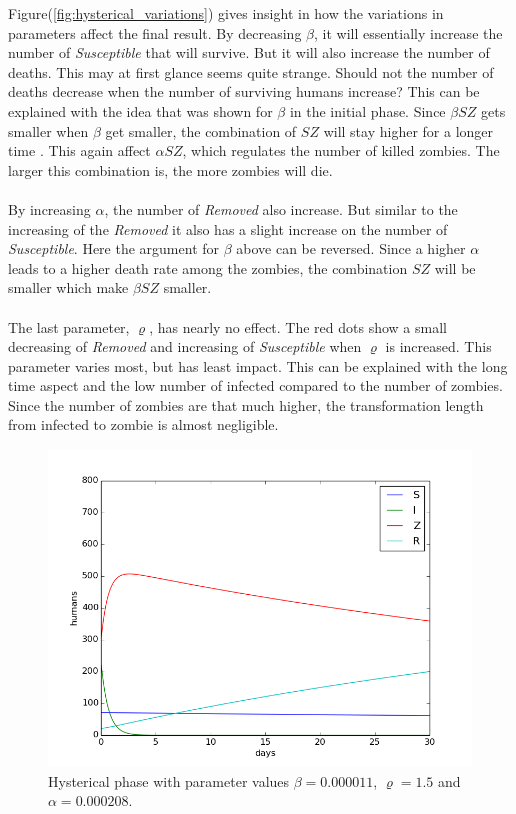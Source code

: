 \documentclass[%
twoside,                 %
final,                   %
10pt]{article}
\begin{document}
Figure(\ref{fig:hysterical_variations}) gives insight in how the variations in parameters affect the final result. By decreasing $\beta$, it will essentially increase the number of \emph{Susceptible} that will survive. But it will also increase the number of deaths. This may at first glance seems quite strange. Should not the number of deaths decrease when the number of surviving humans increase? This can be explained with the idea that was shown for $\beta$ in the initial phase. Since $\beta SZ$ gets smaller when $\beta$ get smaller, the combination of $SZ$ will stay higher for a longer time . This again affect $\alpha SZ$, which regulates the number of killed zombies. The larger this combination is, the more zombies will die. 
\\
\\
By increasing $\alpha$, the number of \emph{Removed} also increase. But similar to the increasing of the \emph{Removed} it also has a slight increase on the number of \emph{Susceptible}. Here the argument for $\beta$ above can be reversed. Since a higher $\alpha$ leads to a higher death rate among the zombies, the combination $SZ$ will be smaller which make $\beta SZ$ smaller.
\\
\\
The last parameter, $\varrho$, has nearly no effect. The red dots show a small decreasing of \emph{Removed} and increasing of \emph{Susceptible}  when $\varrho$ is increased. This parameter varies most, but has least impact. This can be explained with the long time aspect and the low number of infected compared to the number of zombies. Since the number of zombies are that much higher, the transformation length from infected to zombie is almost negligible.  


\begin{figure}[ht]
  \centerline{\includegraphics[width=0.9\linewidth]{plots/WD_zombie_hysterical_1.png}}
  \caption{
  \label{fig:hysterical_1} Hysterical phase with parameter values $\beta = 0.000011$, $\varrho = 1.5$ and $\alpha = 0.000208$.
  }
\end{figure}
\end{document}
